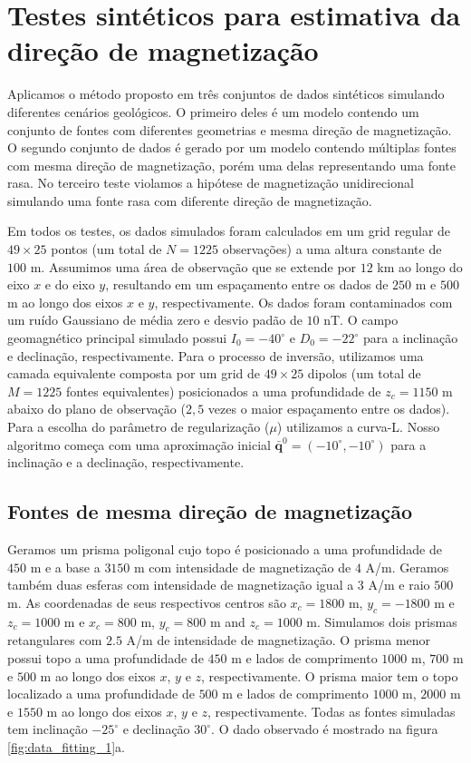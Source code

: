 \chapter{Testes sintéticos para estimativa da direção de magnetização}
\label{chap:synt_tests}

Aplicamos o método proposto em três conjuntos de dados sintéticos simulando diferentes cenários geológicos. O primeiro deles é um modelo contendo um conjunto de fontes com diferentes geometrias e mesma direção de magnetização. O segundo conjunto de dados é gerado por um modelo contendo múltiplas fontes com mesma direção de magnetização, porém uma delas representando uma fonte rasa. No terceiro teste violamos a hipótese de magnetização unidirecional simulando uma fonte rasa com diferente direção de magnetização.  

Em todos os testes, os dados simulados foram calculados em um grid regular de $49 \times 25$ pontos (um total de $N = 1225$ observações) a uma altura constante de $100$ m. Assumimos uma área de observação que se extende por $12$ km ao longo do eixo $x$ e do eixo $y$, resultando em um espaçamento entre os dados de $250$ m e $500$ m ao longo dos eixos $x$ e $y$, respectivamente. Os dados foram contaminados com um ruído Gaussiano de média zero e desvio padão de $10$ nT. O campo geomagnético principal simulado possui $I_0 = -40^\circ$ e $D_0 = -22^\circ$ para a inclinação e declinação, respectivamente. Para o processo de inversão, utilizamos uma camada equivalente composta por um grid de $49 \times 25$ dipolos (um total de $M = 1225$ fontes equivalentes) posicionados a uma profundidade de $z_c = 1150$ m abaixo do plano de observação ($2,5$ vezes o maior espaçamento entre os dados). Para a escolha do parâmetro de regularização ($\mu$) utilizamos a curva-L. Nosso algoritmo começa com uma aproximação inicial $\bar{\mathbf{q}}^{0} = (-10^\circ,-10^\circ)$ para a inclinação e a declinação, respectivamente. 

\section{Fontes de mesma direção de magnetização}

Geramos um prisma poligonal cujo topo é posicionado a uma profundidade de $450$ m e a base a $3150$ m com intensidade de magnetização de $4$ A/m. Geramos também duas esferas com intensidade de magnetização igual a $3$ A/m e raio $500$ m. As coordenadas de seus respectivos centros são $x_c = 1800$ m, $y_c = -1800$ m e $z_c = 1000$ m e $x_c = 800$ m, $y_c = 800$ m and $z_c= 1000$ m. Simulamos dois prismas retangulares com $2.5$ A/m de intensidade de magnetização. O prisma menor possui topo a uma profundidade de $450$ m e lados de comprimento $1000$ m, $700$ m e $500$ m ao longo dos eixos $x$, $y$ e $z$, respectivamente. O prisma maior tem o topo localizado a uma profundidade de $500$ m e lados de comprimento $1000$ m, $2000$ m e $1550$ m ao longo dos eixos $x$, $y$ e $z$, respectivamente. Todas as fontes simuladas tem inclinação $-25^\circ$ e declinação $30^\circ$. O dado observado é mostrado na figura \ref{fig:data_fitting_1}a.

